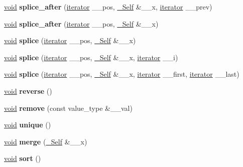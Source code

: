 \begin{DoxyCompactItemize}
\item 
\mbox{\label{classslist_af0e0516c57a7c82210ef9e928e498e95}} 
\hyperlink{interfacevoid}{void} {\bfseries splice\+\_\+after} (\hyperlink{structiterator}{iterator} \+\_\+\+\_\+pos, \hyperlink{classslist}{\+\_\+\+Self} \&\+\_\+\+\_\+x, \hyperlink{structiterator}{iterator} \+\_\+\+\_\+prev)
\item 
\mbox{\label{classslist_ab7aa6a6a336da3138b52e05bc16a1d7e}} 
\hyperlink{interfacevoid}{void} {\bfseries splice\+\_\+after} (\hyperlink{structiterator}{iterator} \+\_\+\+\_\+pos, \hyperlink{classslist}{\+\_\+\+Self} \&\+\_\+\+\_\+x)
\item 
\mbox{\label{classslist_accfb0bcfcb3b7d66ac77836627d20227}} 
\hyperlink{interfacevoid}{void} {\bfseries splice} (\hyperlink{structiterator}{iterator} \+\_\+\+\_\+pos, \hyperlink{classslist}{\+\_\+\+Self} \&\+\_\+\+\_\+x)
\item 
\mbox{\label{classslist_af007b198920ec69bcbb505f748b16cda}} 
\hyperlink{interfacevoid}{void} {\bfseries splice} (\hyperlink{structiterator}{iterator} \+\_\+\+\_\+pos, \hyperlink{classslist}{\+\_\+\+Self} \&\+\_\+\+\_\+x, \hyperlink{structiterator}{iterator} \+\_\+\+\_\+i)
\item 
\mbox{\label{classslist_a451ab5963bc85e39ab64defbfaca7a6c}} 
\hyperlink{interfacevoid}{void} {\bfseries splice} (\hyperlink{structiterator}{iterator} \+\_\+\+\_\+pos, \hyperlink{classslist}{\+\_\+\+Self} \&\+\_\+\+\_\+x, \hyperlink{structiterator}{iterator} \+\_\+\+\_\+first, \hyperlink{structiterator}{iterator} \+\_\+\+\_\+last)
\item 
\mbox{\label{classslist_ab02b39bf97f78d7a8d8161af94ac8013}} 
\hyperlink{interfacevoid}{void} {\bfseries reverse} ()
\item 
\mbox{\label{classslist_aaf7d34720df2a72f30ff2d0540d98486}} 
\hyperlink{interfacevoid}{void} {\bfseries remove} (const value\+\_\+type \&\+\_\+\+\_\+val)
\item 
\mbox{\label{classslist_a3e848b45c90302915a7b36e7a610c3eb}} 
\hyperlink{interfacevoid}{void} {\bfseries unique} ()
\item 
\mbox{\label{classslist_a0372d5605ed4619003a7517496568b24}} 
\hyperlink{interfacevoid}{void} {\bfseries merge} (\hyperlink{classslist}{\+\_\+\+Self} \&\+\_\+\+\_\+x)
\item 
\mbox{\label{classslist_abe0261d20621ec55d9d5e5cd535296e0}} 
\hyperlink{interfacevoid}{void} {\bfseries sort} ()
\end{DoxyCompactItemize}


